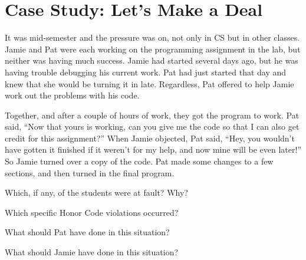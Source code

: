 \section*{Case Study: Let's Make a Deal}

It was mid-semester and the pressure was on, not only in CS but in other classes.
Jamie and Pat were each working on the programming assignment in the lab, but neither was having much success.
Jamie had started several days ago, but he was having trouble debugging his current work.
Pat had just started that day and knew that she would be turning it in late.
Regardless, Pat offered to help Jamie work out the problems with his code.

\vspace{1em}

Together, and after a couple of hours of work, they got the program to work.
Pat said, ``Now that yours is working, can you give me the code so that I can also get credit for this assignment?''
When Jamie objected, Pat said, ``Hey, you wouldn't have gotten it finished if it weren't for my help, and now mine will be even later!''
So Jamie turned over a copy of the code.
Pat made some changes to a few sections, and then turned in the final program.




\Q Which, if any, of the students were at fault? Why?

\begin{answer}[6em]
\end{answer}


\Q Which specific Honor Code violations occurred?

\begin{answer}[6em]
\end{answer}


\Q What should Pat have done in this situation?

\begin{answer}[6em]
\end{answer}


\Q What should Jamie have done in this situation?

\begin{answer}[6em]
\end{answer}
